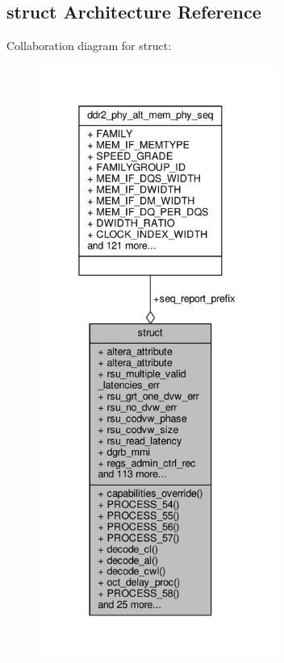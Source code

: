 \subsection{struct Architecture Reference}
\label{classddr2__phy__alt__mem__phy__seq_1_1struct}


Collaboration diagram for struct\+:\nopagebreak
\begin{figure}[H]
\begin{center}
\leavevmode
\includegraphics[height=550pt]{dc/d63/classddr2__phy__alt__mem__phy__seq_1_1struct__coll__graph}
\end{center}
\end{figure}
